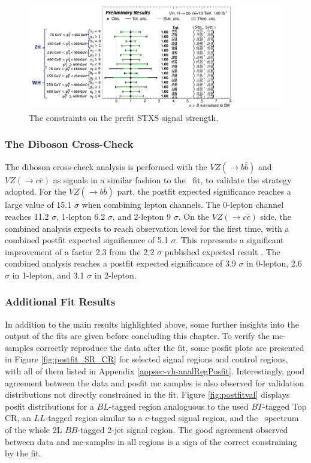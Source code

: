 \begin{figure}[h!]
    \centering
    \includegraphics[width=\textwidth]{Images/VH/Fit/fromSlides/STXS_cons.png}
    \caption{The constraints on the prefit STXS signal strength.}
    \label{fig:fit-stxs-cons}
\end{figure} 

\subsubsection{The Diboson Cross-Check}\label{subsec-DibosonC}
The diboson cross-check analysis is performed with the $VZ (\rightarrow b\bar{b})$ and $VZ (\rightarrow c\bar{c})$ as signals in a similar fashion to the \vhbc\ fit, to validate the strategy adopted. For the $VZ (\rightarrow b\bar{b})$ part, the postfit expected significance reaches a large value of 15.1 $\sigma$ when combining lepton channels. The 0-lepton channel reaches 11.2 $\sigma$, 1-lepton 6.2 $\sigma$, and 2-lepton 9 $\sigma$. On the $VZ (\rightarrow c\bar{c})$ side, the combined analysis expects to reach observation level for the first time, with a combined postfit expected significance of 5.1 $\sigma$. This represents a significant improvement of a factor 2.3 from the 2.2 $\sigma$ published expected result \cite{Collaboration:2721696}. The combined analysis reaches a postfit expected significance of 3.9 $\sigma$ in 0-lepton, 2.6 $\sigma$ in 1-lepton, and 3.1 $\sigma$ in 2-lepton.

\subsubsection{Additional Fit Results}
In addition to the main results highlighted above, some further insights into the output of the fits are given before concluding this chapter. To verify the \gls{mc}-samples correctly reproduce the data after the fit, some posfit plots are presented in Figure \ref{fig:postfit_SR_CR} for selected signal regions and control regions, with all of them listed in Appendix \ref{appsec-vh-analRegPosfit}. Interestingly, good agreement between the data and posfit \gls{mc} samples is also observed for validation distributions not directly constrained in the fit. Figure \ref{fig:postfitval} displays posfit distributions for a $BL$-tagged region analoguous to the used $BT$-tagged Top CR, an $LL$-tagged region similar to a $c$-tagged signal region, and the \ptv\ spectrum of the whole 2L $BB$-tagged 2-jet signal region. The good agreement observed between data and \gls{mc}-samples in all regions is a sign of the correct constraining by the fit. \\

